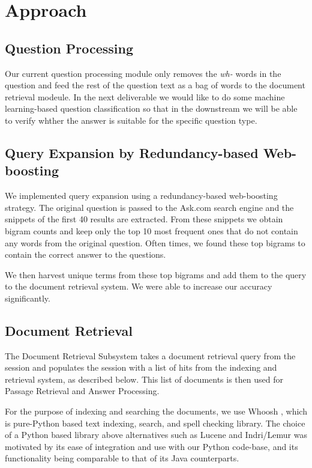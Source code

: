 \documentclass[11pt]{article}
\begin{document}
\section{Approach}
\subsection{Question Processing}
Our current question processing module only removes the {\it wh-} words in the question and feed the rest of the question text as a bag of words to the document retrieval modeule. In the next deliverable we would like to do some machine learning-based question classification so that in the downstream we will be able to verify whther the answer is suitable for the specific question type.

\subsection{Query Expansion by Redundancy-based Web-boosting}
We implemented query expansion using a redundancy-based web-boosting strategy. The original question is passed to the Ask.com search engine and the snippets of the first 40 results are extracted. From these snippets we obtain bigram counts and keep only the top 10 most frequent ones that do not contain any words from the original question. Often times, we found these top bigrams to  contain the correct answer to the questions.

We then harvest unique terms from these top bigrams and add them to the query to the document retrieval system. We were able to increase our accuracy significantly.

\subsection{Document Retrieval}
The Document Retrieval Subsystem takes a document retrieval query from the session and populates the session with a list of hits from the indexing and retrieval system, as described below. This list of documents is then used for Passage Retrieval and Answer Processing.

For the purpose of indexing and searching the documents, we use Whoosh \cite{whoosh}, which is pure-Python based text indexing, search, and spell checking library. The choice of a Python based library above alternatives such as Lucene and Indri/Lemur was motivated by its ease of integration and use with our Python code-base, and its functionality being comparable to that of its Java counterparts. 
\end{document}
